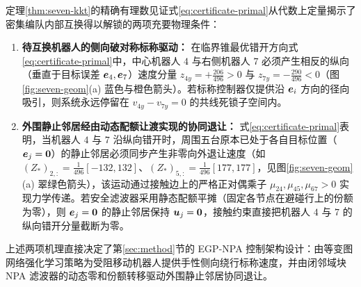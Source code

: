 \begin{remark}[七机器人精确反例揭示的两项协同脱困充要物理条件]\label{rem:two-conditions}
定理\ref{thm:seven-kkt}的精确有理数见证式\eqref{eq:certificate-primal}从代数上定量揭示了密集编队内部互换得以解锁的两项充要物理条件：
\begin{enumerate}
 \item \textbf{待互换机器人的侧向破对称标称驱动：} 在临界锥最优错开方向式\eqref{eq:certificate-primal}中，中心机器人 $4$ 与右侧机器人 $7$ 必须产生相反的纵向（垂直于目标误差 $\boldsymbol{e}_4,\boldsymbol{e}_7$）速度分量 $z_{4y}=+\frac{206}{496}>0$ 与 $z_{7y}=-\frac{290}{496}<0$（图\ref{fig:seven-geom}(a) 蓝色与橙色箭头）。若标称控制器仅提供沿 $\boldsymbol{e}_i$ 方向的径向吸引，则系统永远停留在 $v_{4y}-v_{7y}=0$ 的共线死锁子空间内。
 \item \textbf{外围静止邻居经由动态配额让渡实现的协同退让：} 式\eqref{eq:certificate-primal}表明，当机器人 $4$ 与 $7$ 沿纵向错开时，周围五台原本已处于各自目标位置（$\boldsymbol{e}_j=\boldsymbol 0$）的静止邻居必须同步产生非零向外退让速度（如 $(Z_*)_{2,:}=\frac1{496}[-132,132]$、$(Z_*)_{5,:}=\frac1{496}[177,177]$，见图\ref{fig:seven-geom}(a) 翠绿色箭头），该运动通过接触边上的严格正对偶乘子 $\mu_{24},\mu_{45},\mu_{67}>0$ 实现力学传递。若安全滤波器采用静态配额平摊（固定各节点在避碰行上的份额为零），则 $\boldsymbol{e}_j=\boldsymbol 0$ 的静止邻居保持 $\boldsymbol{u}_j=\boldsymbol 0$，接触约束直接把机器人 $4$ 与 $7$ 的纵向错开分量截断为零。
\end{enumerate}
上述两项机理直接决定了第\ref{sec:method}节的 EGP-NPA 控制架构设计：由等变图网络强化学习策略为受阻移动机器人提供手性侧向绕行标称速度，并由闭邻域块 NPA 滤波器的动态零和份额转移驱动外围静止邻居协同退让。
\end{remark}
